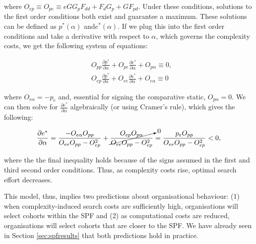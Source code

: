 \noindent where $O_{ep} \equiv O_{pe} \equiv eGG_pF_{dd} + F_dG_p + GF_{pd}$. Under these conditions, solutions to the first order conditions both exist and guarantee a maximum. These solutions can be defined as $p^*(\alpha)$ and$e^*(\alpha)$. If we plug this into the first order conditions and take a derivative with respect to $\alpha$, which governs the complexity costs, we get the following system of equations:

\begin{align}
& O_{pp}\frac{\partial p^*}{\partial \alpha} + O_{pe}\frac{\partial e^*}{\partial \alpha} + O_{p\alpha} \equiv 0, \nonumber \\
& O_{ep}\frac{\partial p^*}{\partial \alpha} + O_{ee}\frac{\partial e^*}{\partial \alpha} + O_{e\alpha} \equiv 0  \nonumber
\end{align}

\noindent where $O_{e\alpha} = -p_e$ and, essential for signing the comparative static, $O_{p\alpha} = 0$. We can then solve for $\frac{\partial e^*}{\partial \alpha}$ algebraically (or using Cramer's rule), which gives the following:

\begin{equation}
\frac{\partial e^*}{\partial \alpha} = \frac{-O_{e\alpha}O_{pp}}{O_{ee}O_{pp} - O_{ep}^2} + \cancelto{0}{\frac{O_{ep}O_{p\alpha}}{O_{ee}O_{pp} - O_{ep}^2}} = \frac{p_eO_{pp}}{O_{ee}O_{pp} - O_{ep}^2} < 0, \label{eq:comp_stat}
\end{equation}

\noindent where the the final inequality holds because of the signs assumed in the first and third second order conditions. Thus, as complexity costs rise, optimal search effort decreases.

This model, thus, implies two predictions about organisational behaviour: (1) when complexity-induced search costs are sufficiently high, organisations will select cohorts within the SPF and (2) as computational costs are reduced, organisations will select cohorts that are closer to the SPF. We have already seen in Section \ref{sec:spfresults} that both predictions hold in practice.


